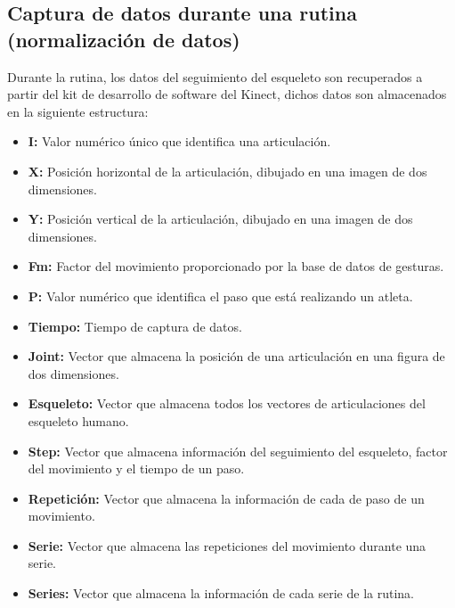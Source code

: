 \subsection{Captura de datos durante una rutina (normalizaci\'on de datos)}\label{dis:recognitionMove}
Durante la rutina, los datos del seguimiento del esqueleto son recuperados a partir del kit de desarrollo de software del Kinect, dichos datos son almacenados en la siguiente estructura:
\begin{itemize}
\item \textbf{I:} Valor num\'erico \'unico que identifica una articulaci\'on.
\item \textbf{X:} Posici\'on horizontal de la articulaci\'on, dibujado en una imagen de dos dimensiones.
\item \textbf{Y:} Posici\'on vertical de la articulaci\'on, dibujado en una imagen de dos dimensiones.
\item \textbf{Fm:} Factor del movimiento proporcionado por la base de datos de gesturas.
\item \textbf{P:} Valor num\'erico que identifica el paso que est\'a realizando un atleta.
\item \textbf{Tiempo:} Tiempo de captura de datos.
\item \textbf{Joint:} Vector que almacena la posici\'on de una articulaci\'on en una figura de dos dimensiones.
\item \textbf{Esqueleto:} Vector que almacena todos los vectores de articulaciones del esqueleto humano.
\item \textbf{Step:} Vector que almacena informaci\'on del seguimiento del esqueleto, factor del movimiento y el tiempo de un paso.
\item \textbf{Repetici\'on:} Vector que almacena la informaci\'on de cada de paso de un movimiento.
\item \textbf{Serie:} Vector que almacena las repeticiones del movimiento durante una serie.
\item \textbf{Series:} Vector que almacena la informaci\'on de cada serie de la rutina.
\end{itemize}
